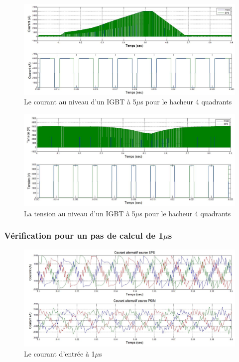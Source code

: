\documentclass[11pt,letterpaper,final]{report}
\begin{document}
\begin{figure}[htb]
\centering
\includegraphics[scale=0.5]{Fig/Hach_AFE/5u/IGBT_cou_hach.jpg}
\caption{Le courant au niveau d'un IGBT à 5$\mu$s pour le hacheur 4 quadrants}
\label{AF_HA_HAA5}
\end{figure}

\begin{figure}[htb]
\centering
\includegraphics[scale=0.5]{Fig/Hach_AFE/5u/IGBT_ten_hach.jpg}
\caption{La tension au niveau d'un IGBT à 5$\mu$s pour le hacheur 4 quadrants}
\label{AF_HA_HAV5}
\end{figure}


\clearpage
\subsubsection{Vérification pour un pas de calcul de 1$\mu$s}

\begin{figure}[htb]
\centering
\includegraphics[scale=0.5]{Fig/Hach_AFE/1u/cour_al.jpg}
\caption{Le courant d'entrée à 1$\mu$s}
\label{AF_HA_cou1}
\end{figure}
\end{document}
